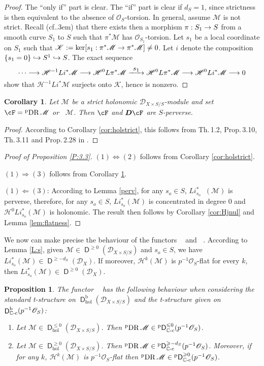 \documentclass[english]{smfart}
\numberwithin{subsection}{section}
\def\shd{\mathcal{D}}\let\cD\shd
\def\shh{\mathcal{H}}
\def\shh{\mathcal{H}}
\def\shk{\mathcal{K}}\let\shk\shk
\def\shm{\mathcal{M}}
\def\sho{\mathcal{O}}\let\cO\sho
\newcommand{\C}{\mathbb{C}}\let\CC\C
\newcommand{\bD}{\boldsymbol{D}}
\newcommand{\rb}{\mathrm{b}}
\newcommand{\hol}{\mathrm{hol}}
\newcommand{\cc}{{\C\textup{-c}}}
\newcommand{\XS}{X\times S}
\newcommand{\DXS}{\shd_{\XS/S}}
\DeclareMathOperator{\pD}{{}^\mathrm{p}\mathsf{D}}
\DeclareMathOperator{\rD}{\mathsf{D}}
\DeclareMathOperator{\pDR}{{}^\mathrm{p}DR}
\DeclareMathOperator{\pSol}{{}^\mathrm{p}Sol}
\let\leq\leqslant
\let\geq\geqslant
\def\cf{cf.\kern.3em}
\newcommand{\pOS}{p^{-1}\sho_S}
\numberwithin{equation}{section}
\theoremstyle{plain}
\newtheorem{proposition}[equation]{Proposition}
\newtheorem{corollary}[equation]{Corollary}
\theoremstyle{definition}
\def\to{\mathchoice{\longrightarrow}{\rightarrow}{\rightarrow}{\rightarrow}}
\def\hto{\mathrel{\lhook\joinrel\to}}
\def\To#1{\mathchoice{\xrightarrow{\textstyle\kern4pt#1\kern3pt}}{\stackrel{#1}{\longrightarrow}}{}{}}
\begin{document}
\begin{proof}
The ``only if'' part is clear. The ``if'' part is clear if $d_S=1$, since strictness is then equivalent to the absence of $\sho_S$-torsion. In general, assume $\shm$ is not strict. Recall (\cf \cite[Cor.\,A.0.2]{Bibi86I}) that there exists then a morphism $\pi:S_1\to S$ from a smooth curve $S_1$ to $S$ such that $\pi^*\shm$ has $\cO_{S_1}$-torsion. Let $s_1$ be a local coordinate on $S_1$ such that $\shk:=\ker[s_1:\pi^*\shm\to \pi^*\shm]\neq0$. Let $i$ denote the composition $\{s_1=0\}\hto S^1\hto S$. The exact sequence
\[
\cdots\to\shh^{-1}L i^*\shm\to\shh^0 L \pi^*\shm\To{s_1}\shh^0L \pi^*\shm\to\shh^0L i^*\shm\to0
\]
show that $\shh^{-1}L i^*\shm$ surjects onto $\shk$, hence is nonzero.
\end{proof}

\begin{corollary}\label{cor-perv}
Let $\shm$ be a strict holonomic $\DXS$-module and set $\cF=\pDR\shm$ or $\pSol\shm$. Then $\cF$ and $\bD\cF$ are $S$-perverse.
\end{corollary}

\begin{proof}
According to Corollary \ref{cor:holstrict}, this follows from Th.\,1.2, Prop.\,3.10, Th.\,3.11 and Prop.\,2.28 in \cite{MF-S12}.
\end{proof}

\begin{proof}[Proof of Proposition \ref{P:3.3}]\mbox{}\par
$(1)\Leftrightarrow (2)$ follows from Corollary \ref{cor:holstrict}.

$(1)\Rightarrow (3)$ follows from Corollary \ref{cor-perv}.

$(1)\Leftarrow (3)$: According to Lemma \ref {perv}, for any $s_o\in S$, $Li^*_{s_o}\pSol(\shm)$ is perverse, therefore, for any $s_o\in S$, $Li^*_{s_o}(\shm)$ is concentrated in degree $0$ and $\shh^0 Li^*_{s_o}(\shm)$ is holonomic. The result then follows by Corollary \ref{cor:Hjnul} and Lemma \ref{lem:flatness}.
\end{proof}

We now can make precise the behaviour of the functors $\pDR$ and $\pSol$. According to Lemma \ref{L:s}, given $\shm\!\in\!\rD^{\geq0} (\DXS)$ and $s_o\in S$, we have $Li^*_{s_o}(\shm)\!\in\! \rD^{\geq-d_S}(\shd_X)$. If moreover, $\shh^k(\shm)$ is $\pOS$-flat for every $k$, then $Li^*_{s_o}(\shm)\in \rD^{\geq 0}(\shd_X)$.

\begin{proposition}\label{P:10}
The functor $\pDR$ has the following behaviour when considering the standard t-structure on $\rD^\rb_\hol(\DXS)$ and the t-structure given on $\rD^\rb_\cc(\pOS)$:
\begin{enumerate}
\item
Let $\shm\in \rD^{\leq0}_\hol(\DXS)$. Then $\pDR\shm\in \pD^{\leq0}_\cc(\pOS)$.

\item
Let $\shm\in \rD^{\geq0}_\hol(\DXS)$. Then $\pDR\shm\in \pD^{\geq-d_S}_\cc(\pOS)$. Moreover, if for any $k$, $\shh^k(\shm)$ is $\pOS$-flat then $\pDR\shm\in \pD^{\geq 0}_\cc(\pOS)$.
\end{enumerate}
\end{proposition}
\end{document}
